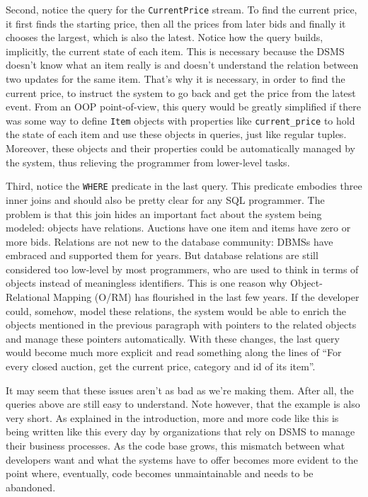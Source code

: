 \documentclass{report}
\begin{document}
Second, notice the query for the \verb=CurrentPrice= stream. To find
the current price, it first finds the starting price, then all the
prices from later bids and finally it chooses the largest, which is
also the latest. Notice how the query builds, implicitly, the current
state of each item. This is necessary because the DSMS doesn't know
what an item really is and doesn't understand the relation between two
updates for the same item. That's why it is necessary, in order to
find the current price, to instruct the system to go back and get the
price from the latest event. From an OOP point-of-view, this query
would be greatly simplified if there was some way to define
\verb=Item= objects with properties like \verb=current_price= to hold
the state of each item and use these objects in queries, just like
regular tuples. Moreover, these objects and their properties could be
automatically managed by the system, thus relieving the programmer
from lower-level tasks.

Third, notice the \verb=WHERE= predicate in the last query. This
predicate embodies three inner joins and should also be pretty clear
for any SQL programmer. The problem is that this join hides an
important fact about the system being modeled: objects have
relations. Auctions have one item and items have zero or more
bids. Relations are not new to the database community: DBMSs have
embraced and supported them for years. But database relations are
still considered too low-level by most programmers, who are used to
think in terms of objects instead of meaningless identifiers. This is
one reason why Object-Relational Mapping (O/RM) has flourished in the
last few years. If the developer could, somehow, model these
relations, the system would be able to enrich the objects mentioned in
the previous paragraph with pointers to the related objects and manage
these pointers automatically. With these changes, the last query would
become much more explicit and read something along the lines of ``For
every closed auction, get the current price, category and id of its
item''.

It may seem that these issues aren't as bad as we're making
them. After all, the queries above are still easy to understand. Note
however, that the example is also very short. As explained in the
introduction, more and more code like this is being written like this
every day by organizations that rely on DSMS to manage their business
processes. As the code base grows, this mismatch between what
developers want and what the systems have to offer becomes more
evident to the point where, eventually, code becomes unmaintainable
and needs to be abandoned.
\end{document}
